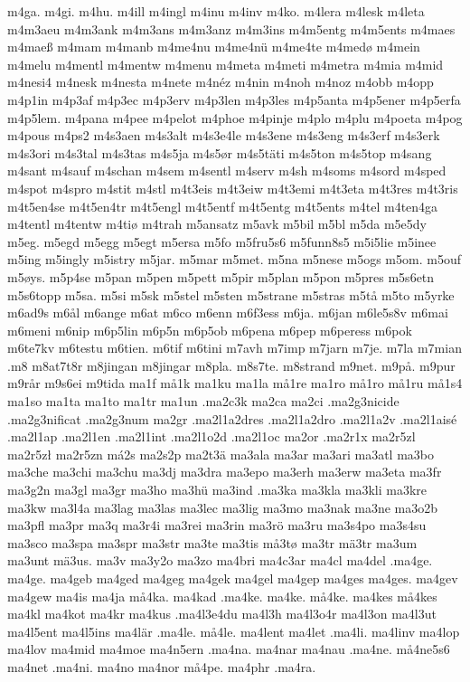 {{m4ga.
m4gi.
m4hu.
m4ill
m4ingl
m4inu
m4inv
m4ko.
m4lera
m4lesk
m4leta
m4m3aeu
m4m3ank
m4m3ans
m4m3anz
m4m3ins
m4m5entg
m4m5ents
m4maes
m4maeß
m4mam
m4manb
m4me4nu
m4me4nü
m4me4te
m4medø
m4mein
m4melu
m4mentl
m4mentw
m4menu
m4meta
m4meti
m4metra
m4mia
m4mid
m4nesi4
m4nesk
m4nesta
m4nete
m4néz
m4nin
m4noh
m4noz
m4obb
m4opp
m4p1in
m4p3af
m4p3ec
m4p3erv
m4p3len
m4p3les
m4p5anta
m4p5ener
m4p5erfa
m4p5lem.
m4pana
m4pee
m4pelot
m4phoe
m4pinje
m4plo
m4plu
m4poeta
m4pog
m4pous
m4ps2
m4s3aen
m4s3alt
m4s3e4le
m4s3ene
m4s3eng
m4s3erf
m4s3erk
m4s3ori
m4s3tal
m4s3tas
m4s5ja
m4s5ør
m4s5täti
m4s5ton
m4s5top
m4sang
m4sant
m4sauf
m4schan
m4sem
m4sentl
m4serv
m4sh
m4soms
m4sord
m4sped
m4spot
m4spro
m4stit
m4stl
m4t3eis
m4t3eiw
m4t3emi
m4t3eta
m4t3res
m4t3ris
m4t5en4se
m4t5en4tr
m4t5engl
m4t5entf
m4t5entg
m4t5ents
m4tel
m4ten4ga
m4tentl
m4tentw
m4tiø
m4trah
m5ansatz
m5avk
m5bil
m5bl
m5da
m5e5dy
m5eg.
m5egd
m5egg
m5egt
m5ersa
m5fo
m5fru5s6
m5funn8s5
m5i5lie
m5inee
m5ing
m5ingly
m5istry
m5jar.
m5mar
m5met.
m5na
m5nese
m5ogs
m5om.
m5ouf
m5øys.
m5p4se
m5pan
m5pen
m5pett
m5pir
m5plan
m5pon
m5pres
m5s6etn
m5s6topp
m5sa.
m5si
m5sk
m5stel
m5sten
m5strane
m5stras
m5tå
m5to
m5yrke
m6ad9s
m6ål
m6ange
m6at
m6co
m6enn
m6f3ess
m6ja.
m6jan
m6le5s8v
m6mai
m6meni
m6nip
m6p5lin
m6p5n
m6p5ob
m6pena
m6pep
m6peress
m6pok
m6te7kv
m6testu
m6tien.
m6tif
m6tini
m7avh
m7imp
m7jarn
m7je.
m7la
m7mian
.m8
m8at7t8r
m8jingan
m8jingar
m8pla.
m8s7te.
m8strand
m9net.
m9på.
m9pur
m9rår
m9s6ei
m9tida
ma1f
må1k
ma1ku
ma1la
må1re
ma1ro
må1ro
må1ru
må1s4
ma1so
ma1ta
ma1to
ma1tr
ma1un
.ma2c3k
ma2ca
ma2ci
.ma2g3nicide
.ma2g3nificat
.ma2g3num
ma2gr
.ma2l1a2dres
.ma2l1a2dro
.ma2l1a2v
.ma2l1aisé
.ma2l1ap
.ma2l1en
.ma2l1int
.ma2l1o2d
.ma2l1oc
ma2or
.ma2r1x
ma2r5zl
ma2r5zł
ma2r5zn
má2s
ma2s2p
ma2t3ä
ma3ala
ma3ar
ma3ari
ma3atl
ma3bo
ma3che
ma3chi
ma3chu
ma3dj
ma3dra
ma3epo
ma3erh
ma3erw
ma3eta
ma3fr
ma3g2n
ma3gl
ma3gr
ma3ho
ma3hü
ma3ind
.ma3ka
ma3kla
ma3kli
ma3kre
ma3kw
ma3l4a
ma3lag
ma3las
ma3lec
ma3lig
ma3mo
ma3nak
ma3ne
ma3o2b
ma3pfl
ma3pr
ma3q
ma3r4i
ma3rei
ma3rin
ma3rö
ma3ru
ma3s4po
ma3s4su
ma3sco
ma3spa
ma3spr
ma3str
ma3te
ma3tis
må3tø
ma3tr
mä3tr
ma3um
ma3unt
mä3us.
ma3v
ma3y2o
ma3zo
ma4bri
ma4c3ar
ma4cl
ma4del
.ma4ge.
ma4ge.
ma4geb
ma4ged
ma4geg
ma4gek
ma4gel
ma4gep
ma4ges
ma4ges.
ma4gev
ma4gew
ma4is
ma4ja
må4ka.
ma4kad
.ma4ke.
ma4ke.
må4ke.
ma4kes
må4kes
ma4kl
ma4kot
ma4kr
ma4kus
.ma4l3e4du
ma4l3h
ma4l3o4r
ma4l3on
ma4l3ut
ma4l5ent
ma4l5ins
ma4lär
.ma4le.
må4le.
ma4lent
ma4let
.ma4li.
ma4linv
ma4lop
ma4lov
ma4mid
ma4moe
ma4n5ern
.ma4na.
ma4nar
ma4nau
.ma4ne.
må4ne5s6
ma4net
.ma4ni.
ma4no
ma4nor
må4pe.
ma4phr
.ma4ra.
}}
